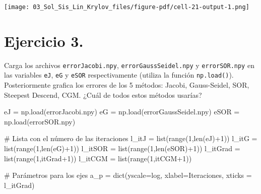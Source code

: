 \documentclass[
  letterpaper,
  DIV=11,
  numbers=noendperiod]{scrreprt}
\newenvironment{Shaded}{\begin{snugshade}}{\end{snugshade}}
\newcommand{\BuiltInTok}[1]{\textcolor[rgb]{0.00,0.23,0.31}{#1}}
\newcommand{\CommentTok}[1]{\textcolor[rgb]{0.37,0.37,0.37}{#1}}
\newcommand{\DecValTok}[1]{\textcolor[rgb]{0.68,0.00,0.00}{#1}}
\newcommand{\NormalTok}[1]{\textcolor[rgb]{0.00,0.23,0.31}{#1}}
\newcommand{\OperatorTok}[1]{\textcolor[rgb]{0.37,0.37,0.37}{#1}}
\newcommand{\StringTok}[1]{\textcolor[rgb]{0.13,0.47,0.30}{#1}}
\begin{document}
\texttt{[image: 03\_Sol\_Sis\_Lin\_Krylov\_files/figure-pdf/cell-21-output-1.png]}

\section{\texorpdfstring{\textbf{Ejercicio
3.}}{Ejercicio 3.}}\label{ejercicio-3.-1}

Carga los archivos \texttt{errorJacobi.npy},
\texttt{errorGaussSeidel.npy} y \texttt{errorSOR.npy} en las variables
\texttt{eJ}, \texttt{eG} y \texttt{eSOR} respectivamente (utiliza la
función \texttt{np.load()}). Posteriormente grafica los errores de los 5
métodos: Jacobi, Gauss-Seidel, SOR, Steepest Descend, CGM. ¿Cuál de
todos estos métodos usarías?

\begin{Shaded}
\begin{Highlighting}[]
\NormalTok{eJ }\OperatorTok{=}\NormalTok{ np.load(}\StringTok{\textquotesingle{}errorJacobi.npy\textquotesingle{}}\NormalTok{)}
\NormalTok{eG }\OperatorTok{=}\NormalTok{ np.load(}\StringTok{\textquotesingle{}errorGaussSeidel.npy\textquotesingle{}}\NormalTok{)}
\NormalTok{eSOR }\OperatorTok{=}\NormalTok{ np.load(}\StringTok{\textquotesingle{}errorSOR.npy\textquotesingle{}}\NormalTok{)}

\CommentTok{\# Lista con el número de las iteraciones}
\NormalTok{l\_itJ }\OperatorTok{=} \BuiltInTok{list}\NormalTok{(}\BuiltInTok{range}\NormalTok{(}\DecValTok{1}\NormalTok{,}\BuiltInTok{len}\NormalTok{(eJ)}\OperatorTok{+}\DecValTok{1}\NormalTok{)) }
\NormalTok{l\_itG }\OperatorTok{=} \BuiltInTok{list}\NormalTok{(}\BuiltInTok{range}\NormalTok{(}\DecValTok{1}\NormalTok{,}\BuiltInTok{len}\NormalTok{(eG)}\OperatorTok{+}\DecValTok{1}\NormalTok{)) }
\NormalTok{l\_itSOR }\OperatorTok{=} \BuiltInTok{list}\NormalTok{(}\BuiltInTok{range}\NormalTok{(}\DecValTok{1}\NormalTok{,}\BuiltInTok{len}\NormalTok{(eSOR)}\OperatorTok{+}\DecValTok{1}\NormalTok{)) }
\NormalTok{l\_itGrad }\OperatorTok{=} \BuiltInTok{list}\NormalTok{(}\BuiltInTok{range}\NormalTok{(}\DecValTok{1}\NormalTok{,itGrad}\OperatorTok{+}\DecValTok{1}\NormalTok{)) }
\NormalTok{l\_itCGM }\OperatorTok{=} \BuiltInTok{list}\NormalTok{(}\BuiltInTok{range}\NormalTok{(}\DecValTok{1}\NormalTok{,itCGM}\OperatorTok{+}\DecValTok{1}\NormalTok{))}

\CommentTok{\# Parámetros para los ejes}
\NormalTok{a\_p }\OperatorTok{=} \BuiltInTok{dict}\NormalTok{(yscale}\OperatorTok{=}\StringTok{\textquotesingle{}log\textquotesingle{}}\NormalTok{, xlabel}\OperatorTok{=}\StringTok{\textquotesingle{}Iteraciones\textquotesingle{}}\NormalTok{, xticks }\OperatorTok{=}\NormalTok{ l\_itGrad)}


\end{Highlighting}
\end{Shaded}
\end{document}
